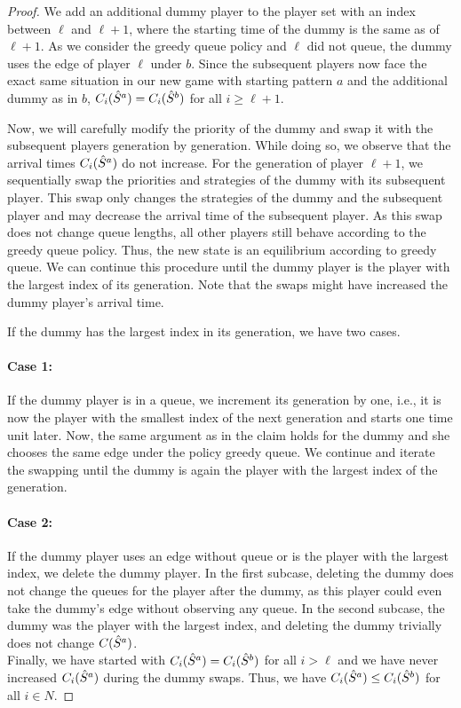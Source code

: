 \begin{proof}
We add an additional dummy player to the player set with an index between $\ell$ and $\ell+1$, where the starting time of the dummy is the same as of $\ell+1$. As we consider the greedy queue policy and $\ell$ did not queue, the dummy uses the edge of player $\ell$ under $b$. Since the subsequent players now face the exact same situation in our new game with starting pattern $a$ and the additional dummy as in $b$, $C_i(\hat{S}^a) = C_i(\hat{S}^b)$ for all $i\geq\ell +1$.

Now, we will carefully modify the priority of the dummy and swap it with the subsequent players generation by generation. While doing so, we observe that the arrival times $C_i(\hat{S}^a)$ do not increase. For the generation of player $\ell +1$, we sequentially swap the priorities and strategies of the dummy with its subsequent player. This swap only changes the strategies of the dummy and the subsequent player and may decrease the arrival time of the subsequent player. As this swap does not change queue lengths, all other players still behave according to the greedy queue policy. Thus, the new state is an equilibrium according to greedy queue. We can continue this procedure until the dummy player is the player with the largest index of its generation. Note that the swaps might have increased the dummy player's arrival time. 

If the dummy has the largest index in its generation, we have two cases. 

\paragraph{Case 1:} If the dummy player is in a queue, we increment its generation by one, i.e., it is now the player with the smallest index of the next generation and starts one time unit later. Now, the same argument as in the claim holds for the dummy and she chooses the same edge under the policy greedy queue. We continue and iterate the swapping until the dummy is again the player with the largest index of the generation.
\paragraph{Case 2:} If the dummy player uses an edge without queue or is the player with the largest index, we delete the dummy player. In the first subcase, deleting the dummy does not change the queues for the player after the dummy, as this player could even take the dummy's edge without observing any queue. In the second subcase, the dummy was the player with the largest index, and deleting the dummy trivially does not change $C(\hat{S}^a)$.\\

\noindent Finally, we have started with $C_i(\hat{S}^a) = C_i(\hat{S}^b)$ for all $i>\ell$ and we have never increased $C_i(\hat{S}^a)$ during the dummy swaps. Thus, we have $C_i(\hat{S}^a)\leq C_i(\hat{S}^b)$ for all $i\in N$. 
\end{proof}